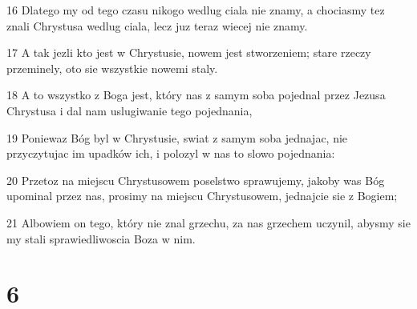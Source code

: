 \par 16 Dlatego my od tego czasu nikogo wedlug ciala nie znamy, a chociasmy tez znali Chrystusa wedlug ciala, lecz juz teraz wiecej nie znamy.
\par 17 A tak jezli kto jest w Chrystusie, nowem jest stworzeniem; stare rzeczy przeminely, oto sie wszystkie nowemi staly.
\par 18 A to wszystko z Boga jest, który nas z samym soba pojednal przez Jezusa Chrystusa i dal nam uslugiwanie tego pojednania,
\par 19 Poniewaz Bóg byl w Chrystusie, swiat z samym soba jednajac, nie przyczytujac im upadków ich, i polozyl w nas to slowo pojednania:
\par 20 Przetoz na miejscu Chrystusowem poselstwo sprawujemy, jakoby was Bóg upominal przez nas, prosimy na miejscu Chrystusowem, jednajcie sie z Bogiem;
\par 21 Albowiem on tego, który nie znal grzechu, za nas grzechem uczynil, abysmy sie my stali sprawiedliwoscia Boza w nim.

\chapter{6}

